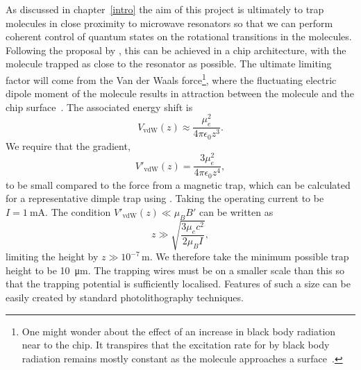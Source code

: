 As discussed in chapter~\ref{intro} the aim of this project is ultimately to
trap molecules in close proximity to microwave resonators so that we can
perform coherent control of quantum states on the rotational transitions in the
molecules.
%
Following the proposal by , this can be achieved in a chip
architecture, with the molecule trapped as close to the resonator as possible.
%
The ultimate limiting factor will come from the Van der Waals force\footnote{
  One might wonder about the effect of an increase in black body radiation near
  to the chip.  It transpires that the excitation rate for \CaF{} by black body
  radiation remains mostly constant as the molecule approaches a
  surface~\cite{PhysRevA.78.052901}.
}, where the fluctuating electric dipole moment of the molecule results in
attraction between the molecule and the chip surface~\cite{2011Ac}. The
associated energy shift is 
%
\begin{equation}
  V_\text{vdW}(z) \approx \frac{\mu_e^2}{4\pi\epsilon_0 z^3}.
\end{equation}
%
We require that the gradient,
%
\begin{equation}
V'_\text{vdW}(z) = \frac{3 \mu_e^2}{4 \pi\epsilon_0 z^4},
\end{equation}
%
to be small compared to the force from a magnetic trap, which can be calculated
for a representative dimple trap using . Taking the
operating current to be $I = \SI{1}{\milli\ampere}$. The condition
$V'_\text{vdW}(z) \ll \mu_B B'$ can be written as
%
\begin{equation}
  z \gg \sqrt{\frac{3 \mu_e c^2}{2 \mu_B I}},
\end{equation}
%
limiting the height by $z \gg 10^{-7}\,\si{\meter}$. We therefore take the
minimum possible trap height to be \SI{10}{\micro\meter}. The trapping wires
must be on a smaller scale than this so that the trapping potential is
sufficiently localised. Features of such a size can be easily created by
standard photolithography techniques.


